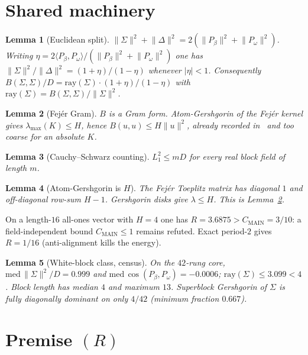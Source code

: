 \documentclass[11pt]{article}
\newtheorem{lemma}{Lemma}
\theoremstyle{remark}
\begin{document}
\section{Shared machinery}\label{sec:shared}

\begin{lemma}[Euclidean split]\label{lem:split}
$\lVert\Sigma\rVert^2+\lVert\Delta\rVert^2
=2(\lVert P_\beta\rVert^2+\lVert P_\omega\rVert^2)$.
Writing $\eta=2\langle P_\beta,P_\omega\rangle/
(\lVert P_\beta\rVert^2+\lVert P_\omega\rVert^2)$ one has
$\lVert\Sigma\rVert^2/\lVert\Delta\rVert^2=(1+\eta)/(1-\eta)$
whenever $\lvert\eta\rvert<1$.  Consequently
$B(\Sigma,\Sigma)/D=\mathrm{ray}(\Sigma)\cdot(1+\eta)/(1-\eta)$
with $\mathrm{ray}(\Sigma)=B(\Sigma,\Sigma)/\lVert\Sigma\rVert^2$.
\end{lemma}

\begin{lemma}[Fej\'er Gram]\label{lem:fejer}
$B$ is a Gram form.  Atom-Gershgorin of the Fej\'er kernel
gives $\lambda_{\max}(K)\le H$, hence $B(u,u)\le H\lVert u\rVert^2$,
already recorded in~\cite{r383} and too coarse for an absolute $K$.
\end{lemma}

\begin{lemma}[Cauchy--Schwarz counting]\label{lem:cs}
$L_1^2\le m D$ for every real block field of length $m$.
\end{lemma}

\begin{lemma}[Atom-Gershgorin is $H$]\label{lem:gersh}
The Fej\'er Toeplitz matrix has diagonal $1$ and off-diagonal
row-sum $H-1$.  Gershgorin disks give $\lambda\le H$.  This is
Lemma~\ref{lem:fejer}.
\end{lemma}

\noindent
On a length-$16$ all-ones vector with $H=4$ one has
$R=3.6875>C_{\mathrm{MAIN}}=3/10$: a field-independent bound
$C_{\mathrm{MAIN}}\le 1$ remains refuted.  Exact period-$2$
gives $R=1/16$ (anti-alignment kills the energy).

\begin{lemma}[White-block class, census]\label{lem:white}
On the $42$-rung core, $\mathrm{med}\,\lVert\Sigma\rVert^2/D=0.999$
and $\mathrm{med}\,\cos(P_\beta,P_\omega)=-0.0006$;
$\mathrm{ray}(\Sigma)\le 3.099<4$.  Block length has median $4$
and maximum $13$.  Superblock Gershgorin of $\Sigma$ is fully
diagonally dominant on only $4/42$ (minimum fraction $0.667$).
\end{lemma}

\section{Premise $(R)$}\label{sec:R}
\end{document}
